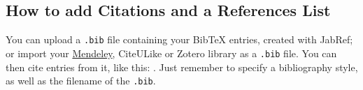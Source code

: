 \documentclass[a4paper]{article}
\begin{document}
\subsection{How to add Citations and a References List}

You can upload a \verb|.bib| file containing your BibTeX entries, created with
JabRef; or import your \href{https://www.overleaf.com/blog/184}{Mendeley},
CiteULike or Zotero library as a \verb|.bib| file. You can then cite entries
from it, like this: \cite{greenwade93}. Just remember to specify a bibliography
style, as well as the filename of the \verb|.bib|.
\end{document}
